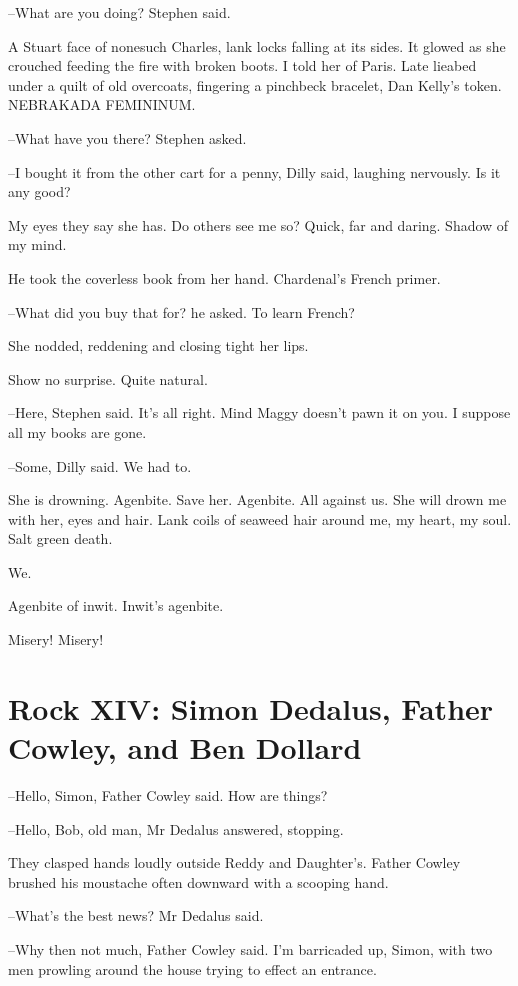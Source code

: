 --What are you doing?
Stephen said.

A Stuart face of nonesuch Charles,
lank locks falling at its sides.
It glowed as she crouched
feeding the fire with broken boots.
I told her of Paris.
Late lieabed under a quilt of old overcoats,
fingering a pinchbeck bracelet,
Dan Kelly's token.
NEBRAKADA FEMININUM.

--What have you there?
Stephen asked.

--I bought it from the other cart for a penny,
Dilly said,
laughing
nervously.
Is it any good?

My eyes they say she has.
Do others see me so?
Quick, far and daring.
Shadow of my mind.

He took the coverless book from her hand.
Chardenal's French primer.

--What did you buy that for?
he asked.
To learn French?

She nodded,
reddening and closing tight her lips.

Show no surprise. Quite natural.

--Here,
Stephen said.
It's all right.
Mind Maggy doesn't pawn it on you.
I suppose all my books are gone.

--Some,
Dilly said.
We had to.

She is drowning.
Agenbite.
Save her.
Agenbite.
All against us.
She will
drown me with her,
eyes and hair.
Lank coils of seaweed hair around me,
my heart, my soul.
Salt green death.

We.

Agenbite of inwit.
Inwit's agenbite.

Misery!
Misery!


\section*{Rock XIV: Simon Dedalus, Father Cowley, and Ben Dollard}


--Hello, Simon,
Father Cowley said.
How are things?

--Hello, Bob, old man,
Mr Dedalus answered,
stopping.

They clasped hands loudly outside Reddy and Daughter's.
Father Cowley
brushed his moustache often downward
with a scooping hand.

--What's the best news?
Mr Dedalus said.

--Why then not much,
Father Cowley said.
I'm barricaded up, Simon,
with
two men prowling around the house
trying to effect an entrance.

